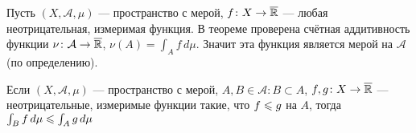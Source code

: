 \begin{slv}\label{мера через инт.}
	Пусть $(X, \mathcal A, \mu)$ --- пространство с мерой, $f \colon X \to \overline{\mathbb R}$ --- любая неотрицательная, измеримая функция. В теореме проверена счётная аддитивность функции $\nu \colon \mathcal A \to \overline {\mathbb R}$, $\nu(A) = \int_A f \, d\mu$. Значит эта функция является мерой на $\mathcal A$ (по определению).
\end{slv}

\begin{zam}
	Если $(X, \mathcal A, \mu)$ --- пространство с мерой, $A, B \in \mathcal{A} : B \subset A$, $f, g \colon X \to \overline{\mathbb R}$ --- неотрицательные, измеримые функции такие, что $f \leqslant g$ на $A$, тогда $\int_B f \, d\mu \leqslant \int_A g \, d\mu$ 
\end{zam}